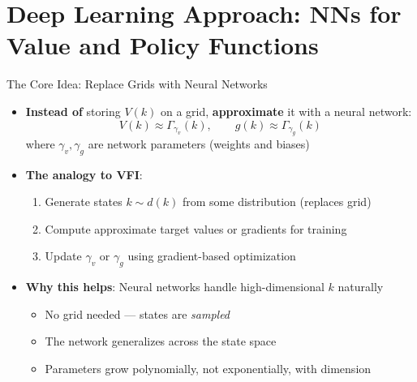\documentclass[10pt,english,aspectratio=169]{beamer}
\begin{document}
\section{Deep Learning Approach: NNs for Value and Policy Functions}

\begin{frame}{The Core Idea: Replace Grids with Neural Networks}
\begin{itemize}
  \item \textbf{Instead of} storing $V(k)$ on a grid, \textbf{approximate} it with a neural network:
    \[
      V(k) \approx \Gamma_{\gamma_v}(k), \qquad g(k) \approx \Gamma_{\gamma_g}(k)
    \]
    where $\gamma_v, \gamma_g$ are network parameters (weights and biases)
  \medskip
  \item \textbf{The analogy to VFI}:
    \begin{enumerate}
      \item Generate states $k \sim d(k)$ from some distribution (replaces grid)
      \item Compute approximate target values or gradients for training
      \item Update $\gamma_v$ or $\gamma_g$ using gradient-based optimization
    \end{enumerate}
  \medskip
  \item \textbf{Why this helps}: Neural networks handle high-dimensional $k$ naturally
    \begin{itemize}
      \item No grid needed --- states are \emph{sampled}
      \item The network generalizes across the state space
      \item Parameters grow polynomially, not exponentially, with dimension
    \end{itemize}
\end{itemize}
\end{frame}
\end{document}
